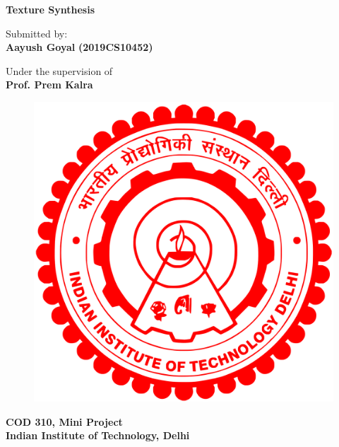 \documentclass[12pt,a4paper]{report}
\begin{document}
\begin{center}
{\Huge \textbf{Texture Synthesis}}\\
\vspace{0.5cm}

\vspace{1 cm}
{\large {Submitted by:}} \\

{\Large \textbf{Aayush Goyal}}
{\Large \textbf{(2019CS10452)}}

\vspace{0.2cm}
\vspace{1 cm}
{\large {Under the supervision of}}\\

{\Large \textbf{Prof. Prem Kalra}}\\

\end{center}

\vspace{6pt}
\begin{center}
\begin{figure}[H]
    \centering
    \includegraphics[scale=0.1]{pics/iitd.png}
    \label{fig:DTU logo}
\end{figure}
{\Large \textbf{COD 310, Mini Project}}\\

{\large \textbf{Indian Institute of Technology, Delhi}}\\

\end{center}
\end{document}
